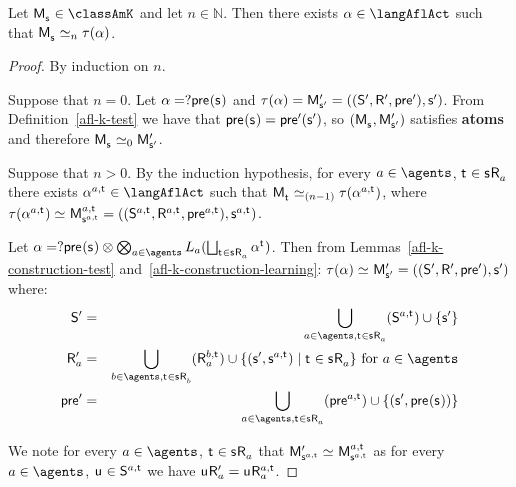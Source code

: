 \begin{proposition}\label{afl-k-correspondence}
Let $\aPModel{\aStateS} \in \classAmK$ and let $n \in \mathbb{N}$. 
Then there exists $\alpha \in \langAflAct$ such that $\aPModel{\aStateS} \bisimilar[n] \tau(\alpha)$.
\end{proposition}

\begin{proof}
By induction on $n$.

Suppose that $n = 0$.
Let $\alpha = \test{\aPrecondition(\aStateS)}$ and $\tau(\alpha) = \aPModelP{\aStateSP} = \aPModelTupleP{\aStateSP}$.
From Definition~\ref{afl-k-test} we have that $\aPrecondition(\aStateS) = \aPreconditionP(\aStateSP)$, so $(\aPModel{\aStateS}, \aPModelP{\aStateSP})$ satisfies {\bf atoms} and therefore $\aPModel{\aStateS} \bisimilar[0] \aPModelP{\aStateSP}$.

Suppose that $n > 0$. 
By the induction hypothesis, for every $\agentA \in \agents$, $\aStateT \in \aStateS \aAccessibility{\agentA}$ there exists $\alpha^{\agentA,\aStateT} \in \langAflAct$ such that $\aPModel{\aStateT} \bisimilar[(n - 1)] \tau(\alpha^{\agentA,\aStateT})$, where $\tau(\alpha^{\agentA,\aStateT}) \bisimilar \aPModel[\agentA,\aStateT]{\aStateS[\agentA,\aStateT]} = \aPModelTuple[\agentA,\aStateT]{\aStateS[\agentA,\aStateT]}$.

Let $\alpha = \test{\aPrecondition(\aStateS)} \compose \bigcompose_{\agentA \in \agents} \learnsA (\bigchoice_{\aStateT \in \aStateS \aAccessibility{\agentA}} \alpha^{\aStateT})$. 
Then from Lemmas~\ref{afl-k-construction-test} and~\ref{afl-k-construction-learning}: $\tau(\alpha) \bisimilar \aPModelP{\aStateSP} = \aPModelTupleP{\aStateSP}$ where:
\begin{eqnarray*}
    \aStatesP &=& \bigcup_{\agentA \in \agents, \aStateT \in \aStateS \aAccessibility{\agentA}} (\aStates[\agentA,\aStateT]) \cup \{\aStateSP\}\\
    \aAccessibilityP{\agentA} &=& \bigcup_{\agentB \in \agents, \aStateT \in \aStateS \aAccessibility{\agentB}} (\aAccessibility[\agentB,\aStateT]{\agentA}) \cup \{(\aStateSP, \aStateS[\agentA,\aStateT]) \mid \aStateT \in \aStateS \aAccessibility{\agentA}\} \text{ for } \agentA \in \agents\\
    \aPreconditionP &=& \bigcup_{\agentA \in \agents, \aStateT \in \aStateS \aAccessibility{\agentA}} (\aPrecondition[\agentA,\aStateT]) \cup \{(\aStateSP, \aPrecondition(\aStateS))\}
\end{eqnarray*}

We note for every $\agentA \in \agents$, $\aStateT \in \aStateS \aAccessibility{\agentA}$ that $\aPModelP{\aStateS[\agentA,\aStateT]} \bisimilar \aPModel[\agentA,\aStateT]{\aStateS[\agentA,\aStateT]}$ as for every $\agentA \in \agents$, $\aStateU \in \aStates[\agentA,\aStateT]$ we have $\aStateU \aAccessibilityP{\agentA} = \aStateU \aAccessibility[\agentA,\aStateT]{\agentA}$.


\end{proof}
